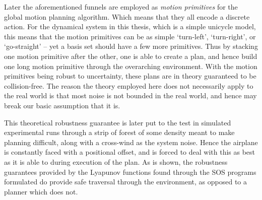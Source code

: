 Later the aforementioned funnels are employed as \textit{motion primitives} for
the global motion planning algorithm. Which means that they all encode a
discrete action. For the dynamical system in this thesis, which is a simple
unicycle model, this means that the motion primitives can be as simple
`turn-left', `turn-right', or `go-straight' -- yet a basis set should have a few
more primitives. Thus by stacking one motion primitive after the other, one is
able to create a plan, and hence build one long motion primitive through the
overarching environment. With the motion primitives being robust to uncertainty,
these plans are in theory guaranteed to be collision-free. The reason the theory
employed here does not necessarily apply to the real world is that most noise is
not bounded in the real world, and hence may break our basic assumption that it
is.

This theoretical robustness guarantee is later put to the test in simulated
experimental runs through a strip of forest of some density meant to make
planning difficult, along with a cross-wind as the system noise. Hence the
airplane is constantly faced with a positional offset, and is forced to deal
with this as best as it is able to during execution of the plan. As is shown,
the robustness guarantees provided by the Lyapunov functions found through the
\ac{SOS} programs formulated do provide safe traversal through the environment,
as opposed to a planner which does not.

